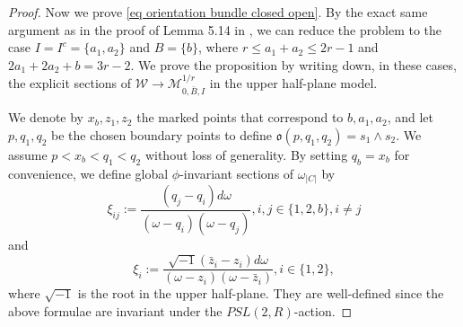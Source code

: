 \documentclass[11pt,a4paper]{article}
\theoremstyle{definition}
\theoremstyle{remark}
\numberwithin{equation}{section}
\begin{document}
\begin{proof}
    
    
    
     Now we prove \eqref{eq orientation bundle closed open}. By the exact same argument as in the proof of Lemma 5.14 in \cite{BCT1}, we can reduce the problem to the case $I=I^c=\{a_1,a_2\}$ and $B=\{b\}$, where $r\le a_1+a_2\le 2r-1$ and $2a_1+2a_2+b=3r-2$. We prove the proposition by writing down, in these cases, the explicit sections of $\mathcal W\to \mathcal M^{1/r}_{0,\bar{B},I}$ in the upper half-plane model.

    We denote by $x_b,z_1,z_2$ the marked points that correspond to $b,a_1,a_2$, and let $p,q_1,q_2$ be the chosen boundary points to define $\mathfrak o(p,q_1,q_2)=s_1\wedge s_2$. We assume $p<x_b<q_1<q_2$ without loss of generality. By setting $q_b=x_b$ for convenience, we define global $\phi$-invariant sections of $\omega_{\lvert C\rvert}$ by 
    $$
    \xi_{ij}:=\frac{(q_j-q_i)d\omega}{(\omega-q_i)(\omega-q_j)}, i,j\in\{1,2,b\},i\ne j
    $$
    and
    $$
    \xi_i:=\frac{\sqrt{-1}(\bar z_i -z_i)d\omega}{(\omega-z_i)(\omega-\bar z_i)}, i\in \{1,2\},
    $$
    where $\sqrt{-1}$ is the root in the upper half-plane. They are well-defined since the above formulae are invariant under the $PSL(2,R)$-action.
    

\end{proof}
\end{document}
